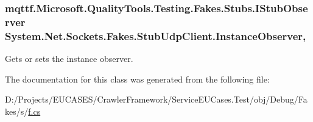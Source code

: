 \hypertarget{class_system_1_1_net_1_1_sockets_1_1_fakes_1_1_stub_udp_client_a1a5813c18e0eef6a9d000a848ac2c284}{
\subsubsection[{Instance\-Observer}]{\setlength{\rightskip}{0pt plus 5cm}mqttf.\-Microsoft.\-Quality\-Tools.\-Testing.\-Fakes.\-Stubs.\-I\-Stub\-Observer System.\-Net.\-Sockets.\-Fakes.\-Stub\-Udp\-Client.\-Instance\-Observer\hspace{0.3cm}{\ttfamily [get]}, {\ttfamily [set]}}}\label{class_system_1_1_net_1_1_sockets_1_1_fakes_1_1_stub_udp_client_a1a5813c18e0eef6a9d000a848ac2c284}


Gets or sets the instance observer.



The documentation for this class was generated from the following file\-:\begin{DoxyCompactItemize}
\item 
D\-:/\-Projects/\-E\-U\-C\-A\-S\-E\-S/\-Crawler\-Framework/\-Service\-E\-U\-Cases.\-Test/obj/\-Debug/\-Fakes/s/\hyperlink{s_2f_8cs}{f.\-cs}\end{DoxyCompactItemize}
